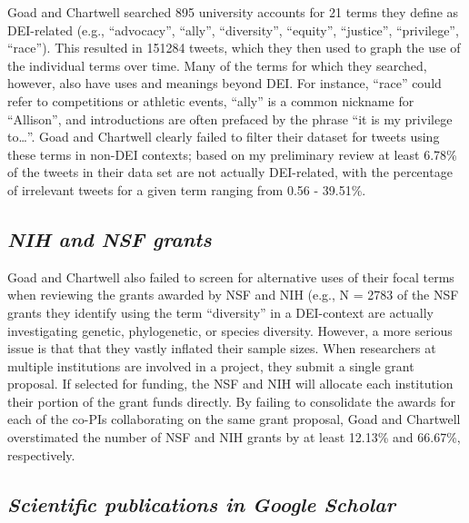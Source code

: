 \documentclass[
  12pt,
  man, donotrepeattitle]{apa6}
\begin{document}
Goad and Chartwell searched 895 university accounts for 21 terms they define as DEI-related (e.g., ``advocacy'', ``ally'', ``diversity'', ``equity'', ``justice'', ``privilege'', ``race''). This resulted in 151284 tweets, which they then used to graph the use of the individual terms over time. Many of the terms for which they searched, however, also have uses and meanings beyond DEI. For instance, ``race'' could refer to competitions or athletic events, ``ally'' is a common nickname for ``Allison'', and introductions are often prefaced by the phrase ``it is my privilege to\ldots{}''. Goad and Chartwell clearly failed to filter their dataset for tweets using these terms in non-DEI contexts; based on my preliminary review at least 6.78\% of the tweets in their data set are not actually DEI-related, with the percentage of irrelevant tweets for a given term ranging from 0.56 - 39.51\%.

\hypertarget{nih-and-nsf-grants}{%
\subsection{\texorpdfstring{\emph{NIH and NSF grants}}{NIH and NSF grants}}\label{nih-and-nsf-grants}}

Goad and Chartwell also failed to screen for alternative uses of their focal terms when reviewing the grants awarded by NSF and NIH (e.g., N = 2783 of the NSF grants they identify using the term ``diversity'' in a DEI-context are actually investigating genetic, phylogenetic, or species diversity. However, a more serious issue is that that they vastly inflated their sample sizes. When researchers at multiple institutions are involved in a project, they submit a single grant proposal. If selected for funding, the NSF and NIH will allocate each institution their portion of the grant funds directly. By failing to consolidate the awards for each of the co-PIs collaborating on the same grant proposal, Goad and Chartwell overstimated the number of NSF and NIH grants by at least 12.13\% and 66.67\%, respectively.

\hypertarget{scientific-publications-in-google-scholar}{%
\subsection{\texorpdfstring{\emph{Scientific publications in Google Scholar}}{Scientific publications in Google Scholar}}\label{scientific-publications-in-google-scholar}}
\end{document}
